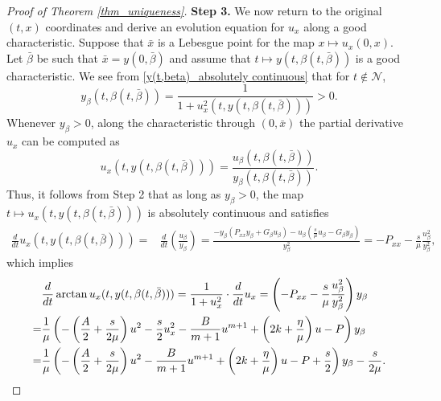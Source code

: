 \documentclass[10pt]{article}
\numberwithin{equation}{section}
\begin{document}
\begin{proof}[Proof of Theorem \ref{thm_uniqueness}]
		\textbf{Step 3.} We now return to the original $(t,x)$ coordinates and derive an evolution equation for $u_x$ along a good characteristic. Suppose that $\bar{x}$ is a Lebesgue point for the map $x\mapsto u_x(0,x)$. Let $\bar{\beta}$ be such that $\bar{x}=y(0,\bar{\beta})$ and assume that $t\mapsto y(t,\beta(t,\bar{\beta}))$ is a good characteristic. 
		We see from \eqref{y(t,beta)_absolutely continuous} that for $t\notin\mathcal{N}$, 
		$$y_\beta(t,\beta(t,\bar{\beta}))=\frac{1}{1+u_x^2(t,y(t,\beta(t,\bar{\beta})))}>0.$$
		Whenever $y_\beta>0$, along the characteristic through $(0,\bar{x})$ the partial derivative $u_x$ can be computed as
		$$u_x\left(t,y(t,\beta(t,\bar{\beta}))\right)=\frac{u_\beta(t,\beta(t,\bar{\beta}))}{y_\beta(t,\beta(t,\bar{\beta}))}.$$
		Thus, it follows from Step 2 that as long as $y_\beta>0$, the map $t\mapsto u_x(t,y(t,\beta(t,\bar{\beta})))$ is absolutely continuous and satisfies
		\begin{align*}
			\frac{d}{dt}u_{x}(t,y(t,\beta(t,\bar{\beta})))=&\frac{d}{dt}\left(\frac{u_{\beta}}{y_{\beta}}\right)=\frac{-y_{\beta}\left(P_{xx}y_{\beta}+G_{\beta}u_{\beta}\right)-u_{\beta}\left(\frac{s}{\mu}u_{\beta}-G_{\beta}y_{\beta}\right)}{y_{\beta}^{2}}=-P_{xx}-\frac{s}{\mu}\frac{u_{\beta}^{2}}{y_{\beta}^{2}},
		\end{align*}
		which implies
		\begin{align}
			&\frac{d}{dt}\arctan u_{x}(t,y(t,\beta(t,\bar{\beta})))=\frac{1}{1+u_{x}^{2}}\cdot\frac{d}{dt}u_{x}=\left(-P_{xx}-\frac{s}{\mu}\frac{u_{\beta}^{2}}{y_{\beta}^{2}}\right)y_{\beta}\notag \\
			=&\frac{1}{\mu}\left(-\left(\frac{A}{2}+\frac{s}{2\mu}\right)u^2-\frac{s}{2}u_x^2-\frac{B}{m+1}u^{m+1}+\left(2k+\frac{\eta}{\mu}\right)u-P\right)y_{\beta}\notag\\
			=&\frac{1}{\mu}\left(-\left(\frac{A}{2}+\frac{s}{2\mu}\right)u^2-\frac{B}{m+1}u^{m+1}+\left(2k+\frac{\eta}{\mu}\right)u-P+\frac{s}{2}\right)y_{\beta}-\frac{s}{2\mu}.
		\end{align}
		

\end{proof}
\end{document}
